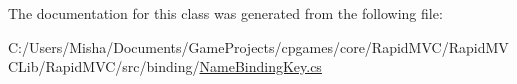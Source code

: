 The documentation for this class was generated from the following file\+:\begin{DoxyCompactItemize}
\item 
C\+:/\+Users/\+Misha/\+Documents/\+Game\+Projects/cpgames/core/\+Rapid\+M\+V\+C/\+Rapid\+M\+V\+C\+Lib/\+Rapid\+M\+V\+C/src/binding/\mbox{\hyperlink{_name_binding_key_8cs}{Name\+Binding\+Key.\+cs}}\end{DoxyCompactItemize}
